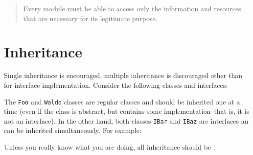 \begin{quote}
  Every module must be able to access only the information and 
  resources that are necessary for its legitimate purpose.
  \cite{noauthor_principle_2016}
\end{quote}


\section{Inheritance}
Single inheritance is encouraged, multiple inheritance is discouraged other 
than for interface implementation. Consider the following classes and 
interfaces:


The \texttt{Foo} and \texttt{Waldo} classes are regular classes and should be 
inherited one at a time (even if the class is abstract, but contains some 
implementation--that is, it is not an interface). In the other hand, both 
classes \texttt{IBar} and \texttt{IBaz} are interfaces an can be inherited 
simultaneously. For example:


Unless you really know what you are doing, all inheritance should be 
.